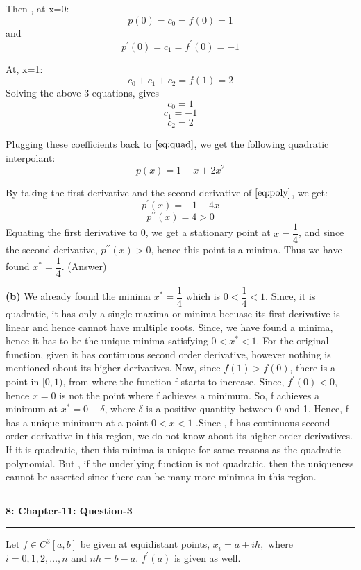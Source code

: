 \documentclass{article}
\newcommand\question[2]{\vspace{.25in}\hrule\textbf{#1: #2}\hrule\vspace{.10in}}
\renewcommand\part[1]{\vspace{.10in}\textbf{(#1)}}
\begin{document}
Then , at x=0:
\[ p(0) = c_0 = f(0) = 1 \]
and
\[ p^\prime(0) = c_1 = f^\prime(0) = -1\]

At, x=1:
\[ c_0 + c_1 + c_2 = f(1) = 2 \]
Solving the above 3 equations, gives
\[ c_0 = 1\]
\[ c_1 = -1\]
\[ c_2 = 2\]

Plugging these coefficients back to $\eqref{eq:quad}$, we get the following quadratic interpolant:
\begin{equation}
	p(x) = 1 - x + 2x^2
	\label{eq:poly}
\end{equation}

By taking the first derivative and the second derivative of $\eqref{eq:poly}$, we get:
\[p^\prime(x) = -1 + 4x\]
\[p^{\prime\prime}(x) = 4 > 0\]
Equating the first derivative to 0, we get a stationary point at $x=\dfrac{1}{4}$, and since the second derivative, $p^{\prime\prime}(x) > 0$, hence this point is a minima. Thus we have found  $x^* = \dfrac{1}{4}$. (Answer) \newline

\part{b}
We already found the minima $x^* = \dfrac{1}{4}$ which is $0 < \dfrac{1}{4} < 1$. Since, it is quadratic, it has only a single maxima or minima becuase its first derivative is linear and hence cannot have multiple roots. Since, we have found a minima, hence it has to be the unique minima satisfying $0 < x^* < 1$. 
For the original function, given it has continuous second order derivative, however nothing is mentioned about its higher derivatives. Now, since $f(1) > f(0)$, there is a point in $[0,1)$, from where the function f starts to increase. Since, $f^\prime(0) < 0$, hence $x=0$ is not the point where f achieves a minimum. So, f achieves a minimum at $x^* = 0 + \delta$, where $\delta$ is a positive quantity between 0 and 1. Hence, f has a unique minimum at a point $0 < x < 1$ .Since , f has continuous second order derivative in this region, we do not know about its higher order derivatives. If it is quadratic, then this minima is unique for same reasons as the quadratic polynomial. But , if the underlying function is not quadratic, then the uniqueness cannot be asserted since there can be many more minimas in this region. 


\question{8}{Chapter-11: Question-3}
Let $f \in C^3[a,b]$ be given at equidistant points, $x_i = a + ih,$ where $i=0,1,2, \dots, n$ and $nh = b-a$. $f^\prime(a)$ is given as well. \newline
\end{document}
